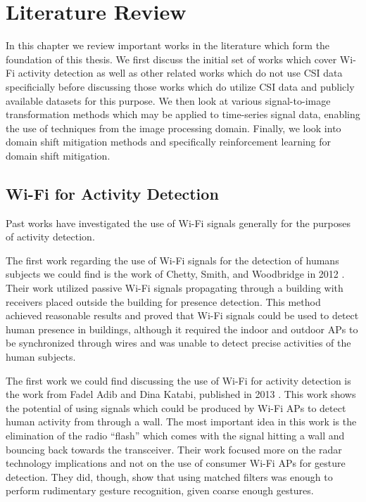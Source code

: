 \chapter{Literature Review}\label{chapter:literature-review}

In this chapter we review important works in the literature which form the foundation of this thesis.
We first discuss the initial set of works which cover Wi-Fi activity detection as well as other related works which do not use CSI data specificially before discussing those works which do utilize CSI data and publicly available datasets for this purpose.
We then look at various signal-to-image transformation methods which may be applied to time-series signal data, enabling the use of techniques from the image processing domain.
Finally, we look into domain shift mitigation methods and specifically reinforcement learning for domain shift mitigation.

\section{Wi-Fi for Activity Detection}

Past works have investigated the use of Wi-Fi signals generally for the purposes of activity detection.

The first work regarding the use of Wi-Fi signals for the detection of humans subjects we could find is the work of Chetty, Smith, and Woodbridge in 2012 \cite{chetty2011through}.
Their work utilized passive Wi-Fi signals propagating through a building with receivers placed outside the building for presence detection.
This method achieved reasonable results and proved that Wi-Fi signals could be used to detect human presence in buildings, although it required the indoor and outdoor APs to be synchronized through wires and was unable to detect precise activities of the human subjects.

The first work we could find discussing the use of Wi-Fi for activity detection is the work from Fadel Adib and Dina Katabi, published in 2013 \cite{adib2013see}.
This work shows the potential of using signals which could be produced by Wi-Fi APs to detect human activity from through a wall.
The most important idea in this work is the elimination of the radio ``flash'' which comes with the signal hitting a wall and bouncing back towards the transceiver.
Their work focused more on the radar technology implications and not on the use of consumer Wi-Fi APs for gesture detection.
They did, though, show that using matched filters was enough to perform rudimentary gesture recognition, given coarse enough gestures.

